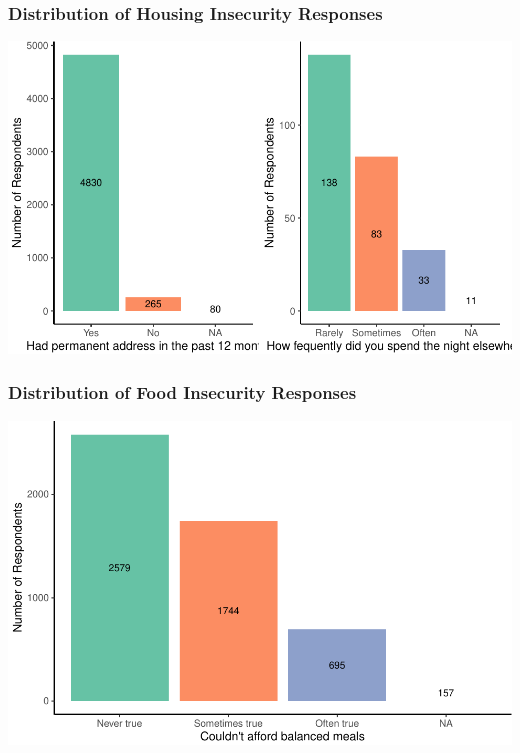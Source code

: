 \documentclass[
  10pt,
]{article}
\begin{document}
\hypertarget{distribution-of-housing-insecurity-responses}{%
\subsubsection{Distribution of Housing Insecurity Responses}\label{distribution-of-housing-insecurity-responses}}

\includegraphics{phase2_report_files/figure-latex/unnamed-chunk-4-1}

\hypertarget{distribution-of-food-insecurity-responses}{%
\subsubsection{Distribution of Food Insecurity Responses}\label{distribution-of-food-insecurity-responses}}

\includegraphics{phase2_report_files/figure-latex/unnamed-chunk-6-1}
\end{document}
